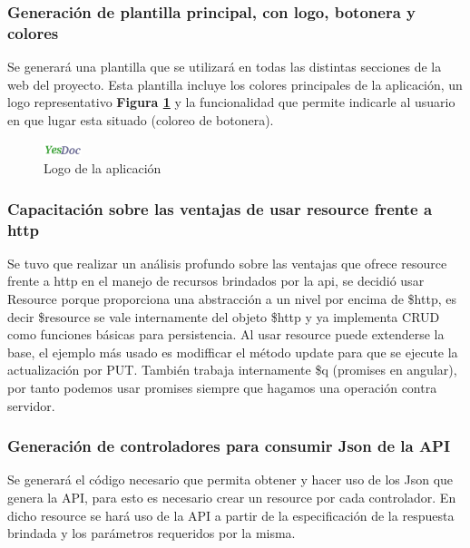    \subsubsection{Generación de plantilla principal, con logo, botonera y colores}
    
Se generará una plantilla que se utilizará en todas las distintas secciones de la web del proyecto. Esta plantilla incluye los colores principales de la aplicación, un logo representativo \textbf{Figura \ref{logoYesDoc}} y la funcionalidad que permite indicarle al usuario en que lugar esta situado (coloreo de botonera). 

	\begin{figure}[h]
        \centering
        \includegraphics[width=0.1\textwidth]{img/tp1_parte2/2-logoYesDoc}
        \caption{Logo de la aplicación}
		\label{logoYesDoc}
    \end{figure}

\subsubsection{Capacitación sobre las ventajas de usar resource frente a http}

Se tuvo que realizar un análisis profundo sobre las ventajas que ofrece resource frente a http en el manejo de recursos brindados por la api, se decidió usar Resource porque proporciona una abstracción a un nivel por encima de \$http, es decir \$resource se vale internamente del objeto \$http y ya implementa CRUD como funciones básicas para persistencia. Al usar resource puede extenderse la base, el ejemplo más usado es modifficar el método update para que se ejecute la actualización por PUT. También trabaja internamente \$q (promises en angular), por tanto podemos usar promises siempre que hagamos una operación contra servidor.

\subsubsection{Generación de controladores para consumir Json de la API}
Se generará el código necesario que permita obtener y hacer uso de los Json que genera la API, para esto es necesario crear un resource por cada controlador. En dicho resource se  hará uso de la API  a partir de la especificación de la respuesta brindada y los parámetros requeridos por la misma.


